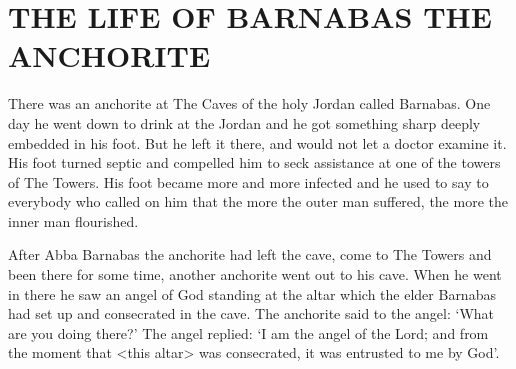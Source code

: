 \chapter{THE LIFE OF BARNABAS THE ANCHORITE}

There was an anchorite at The Caves of the holy Jordan called Barnabas.
One day he went down to drink at the Jordan and he got something sharp deeply embedded in his foot.
But he left it there, and would not let a doctor examine it.
His foot turned septic and compelled him to seck assistance at one of the towers of The Towers.
His foot became more and more infected and he used to say to everybody who called on him that the more the outer man suffered, the more the inner man flourished.

After Abba Barnabas the anchorite had left the cave, come to The Towers and been there for some time, another anchorite went out to his cave.
When he went in there he saw an angel of God standing at the altar which the elder Barnabas had set up and consecrated in the cave.
The anchorite said to the angel: `What are you doing there?'
The angel replied: `I am the angel of the Lord;
and from the moment that <this altar> was consecrated, it was entrusted to me by God'.
